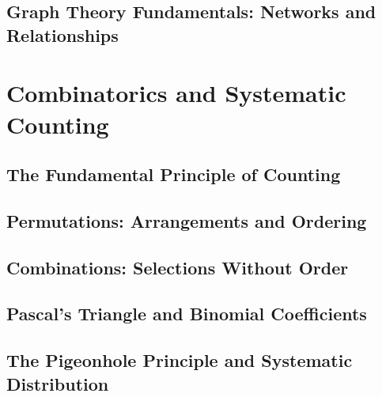 \documentclass[12pt, oneside, openany]{book}
\let\oldchapter\chapter
\renewcommand{\chapter}{
	\cleardoublepage
	\thispagestyle{chapter}
	\oldchapter
}
\begin{document}
\section{Graph Theory Fundamentals: Networks and Relationships}


\chapter{Combinatorics and Systematic Counting}

\section{The Fundamental Principle of Counting}

\section{Permutations: Arrangements and Ordering}

\section{Combinations: Selections Without Order}

\section{Pascal's Triangle and Binomial Coefficients}

\section{The Pigeonhole Principle and Systematic Distribution}
\end{document}
